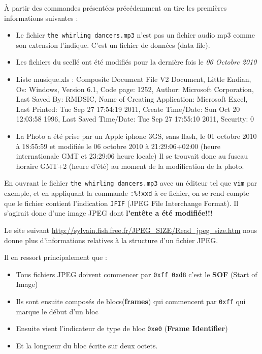 \documentclass[a4paper,11pt]{article}
\begin{document}
À partir des commandes présentées précédemment on tire les premières informations suivantes :
\begin{itemize}
    \item  Le fichier {\tt the whirling dancers.mp3} n'est pas un fichier
        audio mp3 comme son extension l'indique.
        C'est un fichier de données (data file).
    \item Les fichiers du scellé ont été modifiés pour la dernière fois le \emph{06 Octobre 2010}

    \item Liste musique.xls :
    Composite Document File V2 Document, Little Endian, Os:
    Windows, Version 6.1, Code page: 1252, Author: Microsoft Corporation, Last Saved By:
    RMDSIC, Name of Creating Application: Microsoft Excel, Last Printed: Tue Sep 27 17:54:19
    2011, Create Time/Date: Sun Oct 20 12:03:58 1996, Last Saved Time/Date: Tue Sep 27
    17:55:10 2011, Security: 0

    \item La Photo a été prise par un Apple iphone 3GS, sans flash,  le 01 octobre 2010 à 18:55:59 et modifiée
  le 06 octobre 2010 à 21:29:06+02:00 (heure internationale GMT et 23:29:06 heure locale)
 Il se trouvait donc au fuseau horaire GMT+2 (heure d'été) au moment de la modification de la
photo.
\end{itemize}

En ouvrant le fichier {\tt the whirling dancers.mp3} avec un éditeur tel que {\tt vim} par
exemple, et en appliquant la commande {\tt :\%!xxd} à ce fichier, on se rend compte que le
fichier contient l'indication {\tt JFIF} (JPEG File Interchange Format). Il s'agirait donc
d'une image JPEG dont {\bf l'entête a été modifiée!!!}

Le site suivant \url{http://sylvain.fish.free.fr/JPEG\_SIZE/Read\_jpeg\_size.htm} nous donne
plus d'informations relatives à la structure d'un fichier JPEG.

Il en ressort principalement que :
\begin{itemize}
    \item Tous fichiers JPEG doivent commencer par {\tt 0xff 0xd8} c'est le {\bf SOF} (Start of Image)
    \item Ils sont ensuite composés de blocs({\bf frames}) qui commencent par {\tt 0xff} qui marque le
  début d'un bloc
    \item Ensuite vient l'indicateur de type de bloc {\tt 0xe0} ({\bf Frame Identifier})
    \item Et la longueur du bloc écrite sur deux octets.
\end{itemize}
\end{document}
